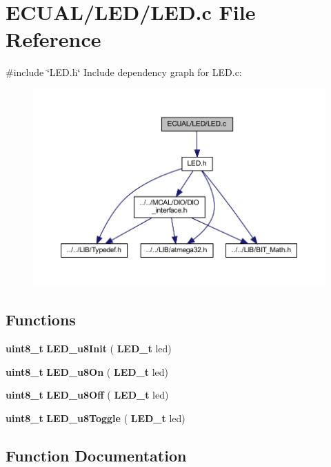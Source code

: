 \section{E\+C\+U\+A\+L/\+L\+E\+D/\+L\+ED.c File Reference}
\label{_l_e_d_8c}
{\ttfamily \#include \char`\"{}L\+E\+D.\+h\char`\"{}}\newline
Include dependency graph for L\+E\+D.\+c\+:
\nopagebreak
\begin{figure}[H]
\begin{center}
\leavevmode
\includegraphics[width=350pt]{_l_e_d_8c__incl}
\end{center}
\end{figure}
\subsection*{Functions}
\begin{DoxyCompactItemize}
\item 
\textbf{ uint8\+\_\+t} \textbf{ L\+E\+D\+\_\+u8\+Init} (\textbf{ L\+E\+D\+\_\+t} led)
\item 
\textbf{ uint8\+\_\+t} \textbf{ L\+E\+D\+\_\+u8\+On} (\textbf{ L\+E\+D\+\_\+t} led)
\item 
\textbf{ uint8\+\_\+t} \textbf{ L\+E\+D\+\_\+u8\+Off} (\textbf{ L\+E\+D\+\_\+t} led)
\item 
\textbf{ uint8\+\_\+t} \textbf{ L\+E\+D\+\_\+u8\+Toggle} (\textbf{ L\+E\+D\+\_\+t} led)
\end{DoxyCompactItemize}


\subsection{Function Documentation}
\mbox{\label{_l_e_d_8c_a5ffbd3f57e696c662ae3ae52b119e867}} 
